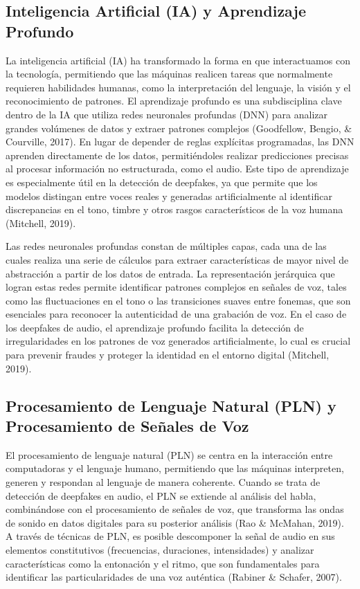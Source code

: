 \subsection{Inteligencia Artificial (IA) y Aprendizaje Profundo}
La inteligencia artificial (IA) ha transformado la forma en que interactuamos con la tecnología, permitiendo que las máquinas realicen tareas que normalmente requieren habilidades humanas, como la interpretación del lenguaje, la visión y el reconocimiento de patrones. El aprendizaje profundo es una subdisciplina clave dentro de la IA que utiliza redes neuronales profundas (DNN) para analizar grandes volúmenes de datos y extraer patrones complejos (Goodfellow, Bengio, \& Courville, 2017). En lugar de depender de reglas explícitas programadas, las DNN aprenden directamente de los datos, permitiéndoles realizar predicciones precisas al procesar información no estructurada, como el audio. Este tipo de aprendizaje es especialmente útil en la detección de deepfakes, ya que permite que los modelos distingan entre voces reales y generadas artificialmente al identificar discrepancias en el tono, timbre y otros rasgos característicos de la voz humana (Mitchell, 2019).

Las redes neuronales profundas constan de múltiples capas, cada una de las cuales realiza una serie de cálculos para extraer características de mayor nivel de abstracción a partir de los datos de entrada. La representación jerárquica que logran estas redes permite identificar patrones complejos en señales de voz, tales como las fluctuaciones en el tono o las transiciones suaves entre fonemas, que son esenciales para reconocer la autenticidad de una grabación de voz. En el caso de los deepfakes de audio, el aprendizaje profundo facilita la detección de irregularidades en los patrones de voz generados artificialmente, lo cual es crucial para prevenir fraudes y proteger la identidad en el entorno digital (Mitchell, 2019).

\subsection{Procesamiento de Lenguaje Natural (PLN) y Procesamiento de Señales de Voz}
El procesamiento de lenguaje natural (PLN) se centra en la interacción entre computadoras y el lenguaje humano, permitiendo que las máquinas interpreten, generen y respondan al lenguaje de manera coherente. Cuando se trata de detección de deepfakes en audio, el PLN se extiende al análisis del habla, combinándose con el procesamiento de señales de voz, que transforma las ondas de sonido en datos digitales para su posterior análisis (Rao \& McMahan, 2019). A través de técnicas de PLN, es posible descomponer la señal de audio en sus elementos constitutivos (frecuencias, duraciones, intensidades) y analizar características como la entonación y el ritmo, que son fundamentales para identificar las particularidades de una voz auténtica (Rabiner \& Schafer, 2007).

